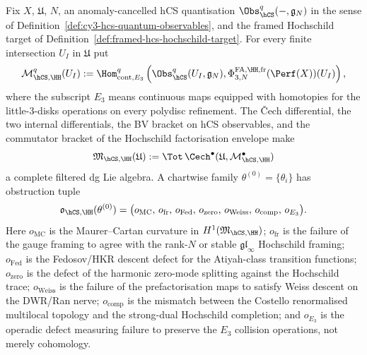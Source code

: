 \begin{definition}
\label{def:hcs-hochschild-obstruction-complex}
Fix $X$, $\mathfrak U$, $N$, an anomaly-cancelled hCS quantisation
$\Obs_{\hCS}^{q}(-,\mathfrak g_N)$ in the sense of
Definition~\ref{def:cy3-hcs-quantum-observables}, and the framed
Hochschild target of Definition~\ref{def:framed-hcs-hochschild-target}.
For every finite intersection $U_I$ in $\mathfrak U$ put
\[
 \mathcal M^q_{\hCS,\HH}(U_I)
 :=
 \Hom^q_{\mathrm{cont},E_3}
 \left(
 \Obs_{\hCS}^{q}(U_I,\mathfrak g_N),
 \Phi^{\mathrm{FA},\HH,\mathrm{fr}}_{3,N}(\Perf(X))(U_I)
 \right),
\]
where the subscript $E_3$ means continuous maps equipped with homotopies
for the little-$3$-disks operations on every polydisc refinement. The
\v{C}ech differential, the two internal differentials, the BV bracket on
hCS observables, and the commutator bracket of the Hochschild
factorisation envelope make
\[
 \mathfrak M_{\hCS,\HH}(\mathfrak U)
 :=
 \Tot\,\Cech^\bullet(\mathfrak U,\mathcal M^\bullet_{\hCS,\HH})
\]
a complete filtered dg Lie algebra. A chartwise family
$\theta^{(0)}=\{\theta_i\}$ has obstruction tuple
\[
 \mathfrak o_{\hCS,\HH}(\theta^{(0)})
 =
 \bigl(
 o_{\mathrm{MC}},\,
 o_{\mathrm{fr}},\,
 o_{\mathrm{Fed}},\,
 o_{\mathrm{zero}},\,
 o_{\mathrm{Weiss}},\,
 o_{\mathrm{comp}},\,
 o_{E_3}
 \bigr).
\]
Here $o_{\mathrm{MC}}$ is the Maurer--Cartan curvature in
$H^1(\mathfrak M_{\hCS,\HH})$; $o_{\mathrm{fr}}$ is the failure of the
gauge framing to agree with the rank-$N$ or stable
$\mathfrak{gl}_\infty$ Hochschild framing; $o_{\mathrm{Fed}}$ is the
Fedosov/HKR descent defect for the Atiyah-class transition functions;
$o_{\mathrm{zero}}$ is the defect of the harmonic zero-mode splitting
against the Hochschild trace; $o_{\mathrm{Weiss}}$ is the failure of
the prefactorisation maps to satisfy Weiss descent on the DWR/Ran
nerve; $o_{\mathrm{comp}}$ is the mismatch between the Costello
renormalised multilocal topology and the strong-dual Hochschild
completion; and $o_{E_3}$ is the operadic defect measuring failure to
preserve the $E_3$ collision operations, not merely cohomology.
\end{definition}

